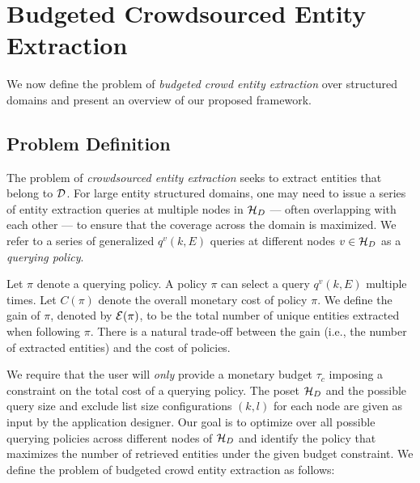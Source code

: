 \section{Budgeted Crowdsourced Entity Extraction}
\label{sec:problem}
We now define the problem of {\em budgeted crowd entity extraction} over structured domains and present an overview of our proposed framework.
\subsection{Problem Definition}
\label{sec:extraction}
The problem of {\em crowdsourced entity extraction} seeks to extract entities that belong to $\mathcal{D}$.  For large entity structured domains, one may need to issue a series of entity extraction queries at multiple nodes in  $\mathcal{H}_D$ --- often overlapping with each other --- to ensure that the coverage across the domain is maximized. We refer to a series of  generalized $q^v(k,E)$ queries at different nodes $v \in \mathcal{H}_D$ as a {\em querying policy}.

Let $\pi$ denote a querying policy. A policy $\pi$ can select a query $q^v(k,E)$ multiple times. Let $C(\pi)$ denote the overall monetary cost of policy $\pi$. We define the gain of $\pi$, denoted by $\mathcal{E}(\pi)$, to be the total number of unique entities extracted when following $\pi$. There is a natural trade-off between the gain (i.e., the number of extracted entities) and the cost of policies. 

We require that the user will {\em only} provide a monetary budget $\tau_c$ imposing a constraint on the total cost of a querying policy. The poset $\mathcal{H}_D$ and the possible query size and exclude list size configurations $(k,l)$ for each node are given as input by the application designer. Our goal is to optimize over all possible querying policies across different nodes of $\mathcal{H}_D$ and identify the policy that maximizes the number of retrieved entities under the given budget constraint. We define the problem of budgeted crowd entity extraction as follows:

